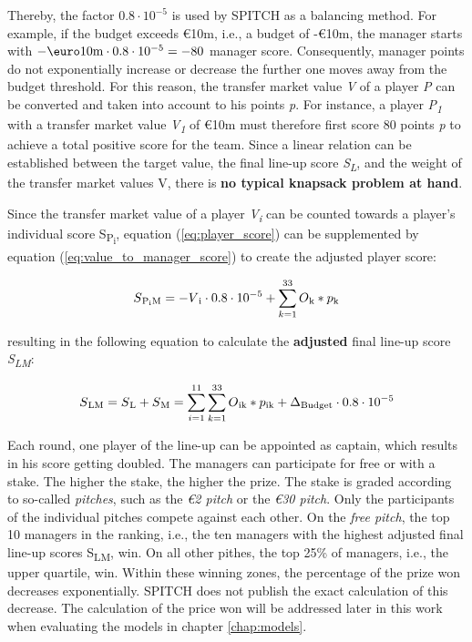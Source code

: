 Thereby, the factor $0.8\cdot10^{-5}$ is used by SPITCH as a balancing method. \parencite[cf.][]{spitch_rules_2021} For example, if the budget exceeds €10m, i.e., a budget of -€10m, the manager starts with $-\textup{\euro}10\textup{m}\cdot0.8\cdot10^{-5} = -80$ manager score. Consequently, manager points do not exponentially increase or decrease the further one moves away from the budget threshold. For this reason, the transfer market value \emph{V} of a player \emph{P} can be converted and taken into account to his points \emph{p}. For instance, a player \emph{P\textsubscript{1}} with a transfer market value \emph{V\textsubscript{1}} of €10m must therefore first score 80 points \emph{p} to achieve a total positive score for the team. Since a linear relation can be established between the target value, the final line-up score \emph{S\textsubscript{L}}, and the weight of the transfer market values V, there is \textbf{no typical knapsack problem at hand}.

Since the transfer market value of a player \emph{V\textsubscript{i}} can be counted towards a player's individual score S\textsubscript{P\textsubscript{i}}, equation (\ref{eq:player_score}) can be supplemented by equation (\ref{eq:value_to_manager_score}) to create the adjusted player score:

\begin{equation}
    S\textsubscript{P\textsubscript{i}M} = -V\textsubscript{i}\cdot0.8\cdot10^{-5} + \sum_{k=1}^{33} O\textsubscript{k} * p\textsubscript{k}
    \label{eq:player_score_with_value}
\end{equation}

resulting in the following equation to calculate the \textbf{adjusted} final line-up score \emph{S\textsubscript{LM}}:

\begin{equation}
    S\textsubscript{LM} = S\textsubscript{L} + S\textsubscript{M} = \sum_{i=1}^{11} \sum_{k=1}^{33} O\textsubscript{ik} * p\textsubscript{ik} + \Delta \textsubscript{Budget}\cdot0.8\cdot10^{-5}
    \label{eq:final_score_with_ms}
\end{equation}

Each round, one player of the line-up can be appointed as captain, which results in his score getting doubled. The managers can participate for free or with a stake. The higher the stake, the higher the prize. The stake is graded according to so-called \emph{pitches}, such as the \emph{€2 pitch} or the \emph{€30 pitch}. Only the participants of the individual pitches compete against each other. On the \emph{free pitch}, the top 10 managers in the ranking, i.e., the ten managers with the highest adjusted final line-up scores {S\textsubscript{LM}}, win. On all other pithes, the top 25\% of managers, i.e., the upper quartile, win. Within these winning zones, the percentage of the prize won decreases exponentially. SPITCH does not publish the exact calculation of this decrease. The calculation of the price won will be addressed later in this work when evaluating the models in chapter \ref{chap:models}.